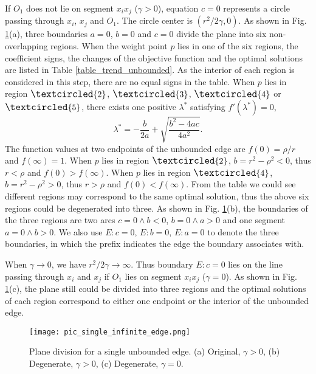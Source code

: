 \documentclass[final,3p,times]{elsarticle}
\begin{document}
If $O_1$ does not lie on segment $x_ix_j$ ($\gamma>0$), equation $c=0$ represents a circle passing through $x_i$, $x_j$ and $O_1$. The circle center is $(r^2/2\gamma,0)$. As shown in Fig. \ref{pic_division_unbounded}(a), three boundaries $a=0$, $b=0$ and $c=0$ divide the plane into six non-overlapping regions. When the weight point $p$ lies in one of the six regions, the coefficient signs, the changes of the objective function and the optimal solutions are listed in Table \ref{table_trend_unbounded}. As the interior of each region is considered in this step, there are no equal signs in the table. When $p$ lies in region $\large{\textcircled{\small{2}}}$, $\large{\textcircled{\small{3}}}$, $\large{\textcircled{\small{4}}}$ or $\large{\textcircled{\small{5}}}$, there exists one positive $\lambda^*$ satisfying $f'(\lambda^*)=0$,
\begin{equation}
\label{eq_lambda}
\lambda^*=-\frac{b}{2a}+\sqrt{\frac{b^2-4ac}{4a^2}}.
\end{equation}
The function values at two endpoints of the unbounded edge are $f(0)=\rho/r$ and $f(\infty)=1$. When $p$ lies in region $\large{\textcircled{\small{2}}}$, $b=r^2-\rho^2<0$, thus $r<\rho$ and $f(0)>f(\infty)$. When $p$ lies in region $\large{\textcircled{\small{4}}}$, $b=r^2-\rho^2>0$, thus $r>\rho$ and $f(0)<f(\infty)$.
From the table we could see different regions may correspond to the same optimal solution, thus the above six regions could be degenerated into three. As shown in Fig. \ref{pic_division_unbounded}(b), the boundaries of the three regions are two arcs $c=0\wedge b<0$, $b=0\wedge a>0$ and one segment $a=0\wedge b>0$. We also use $E:c=0$, $E:b=0$, $E:a=0$ to denote the three boundaries, in which the prefix indicates the edge the boundary associates with.

When $\gamma\rightarrow 0$, we have $r^2/2\gamma\rightarrow\infty$. Thus boundary $E:c=0$ lies on the line passing through $x_i$ and $x_j$ if $O_1$ lies on segment $x_ix_j$ ($\gamma=0$). As shown in Fig. \ref{pic_division_unbounded}(c), the plane still could be divided into three regions and the optimal solutions of each region correspond to either one endpoint or the interior of the unbounded edge.

\begin{figure}
  \centering
  \texttt{[image: pic\_single\_infinite\_edge.png]}
  \caption{Plane division for a single unbounded edge. (a) Original, $\gamma>0$, (b) Degenerate, $\gamma>0$, (c) Degenerate, $\gamma=0$.}
  \label{pic_division_unbounded}
\end{figure}
\end{document}
